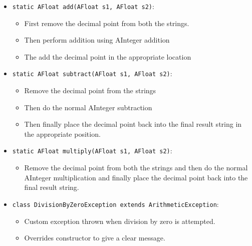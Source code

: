 \documentclass{article}
\begin{document}
\begin{itemize}
    \item \texttt{static AFloat add(AFloat s1, AFloat s2)}:
    \begin{itemize}
        \item First remove the decimal point from both the strings.
        \item Then perform addition using AInteger addition
        \item The add the decimal point in the appropriate location
    \end{itemize}
\end{itemize}



\begin{itemize}
    \item \texttt{static AFloat subtract(AFloat s1, AFloat s2)}:
    \begin{itemize}
    \item Remove the decimal point from the strings
    \item Then do the normal AInteger subtraction
    \item Then finally place the decimal point back into the final result string in the appropriate position.
    \end{itemize}
\end{itemize}


\begin{itemize}
    \item \texttt{static AFloat multiply(AFloat s1, AFloat s2)}:
    \begin{itemize}
    \item Remove the decimal point from both the strings and then do the normal AInteger multiplication and finally place the decimal point back into the final result string.
    \end{itemize}
\end{itemize}


\begin{itemize}
    \item \texttt{class DivisionByZeroException extends ArithmeticException}:
    \begin{itemize}
        \item Custom exception thrown when division by zero is attempted.
        \item Overrides constructor to give a clear message.
    \end{itemize}
\end{itemize}
\end{document}
